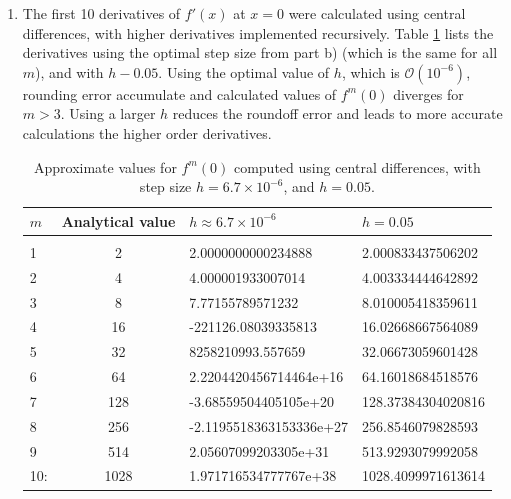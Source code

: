 \documentclass{article}
\begin{document}
\begin{enumerate}
\begin{enumerate}
    \item The first 10 derivatives of $f'(x)$ at $x=0$ were calculated using central differences, with higher derivatives implemented recursively. 
    Table \ref{tab:1c} lists the derivatives using the optimal step size from part b) (which is the same for all $m$), and with $h-0.05$.
    Using the optimal value of $h$, which is $\mathcal{O}(10^{-6})$, rounding error accumulate and calculated values of $f^m(0)$ diverges for $m>3$. 
    Using a larger $h$ reduces the roundoff error and leads to more accurate calculations the higher order derivatives.
    \begin{table}[H]
        \centering
        \begin{tabular}{l | c l l}
            $m$ & Analytical value & $h \approx 6.7\times10^{-6}$ & $h=0.05$\\ [0.2 em] \hline  \\[-0.8em] 
            1 & 2 & 2.0000000000234888 & 2.000833437506202\\
            2 & 4& 4.000001933007014 & 4.003334444642892\\
            3 & 8&7.77155789571232 & 8.010005418359611\\
            4 & 16&-221126.08039335813 & 16.02668667564089\\
            5 & 32&8258210993.557659 & 32.06673059601428\\
            6 & 64&2.2204420456714464e+16 & 64.16018684518576\\
            7 & 128&-3.68559504405105e+20 & 128.37384304020816\\
            8 & 256&-2.1195518363153336e+27 & 256.8546079828593\\
            9 & 514&2.05607099203305e+31 & 513.9293079992058\\
            10: & 1028&1.971716534777767e+38 & 1028.4099971613614\\
        \end{tabular}
        \caption{Approximate values for $f^m(0)$ computed using central differences, with step size $h=6.7\times10^{-6}$, and $h=0.05$.}
        \label{tab:1c}
    \end{table}

\end{enumerate}
\end{enumerate}
\end{document}
